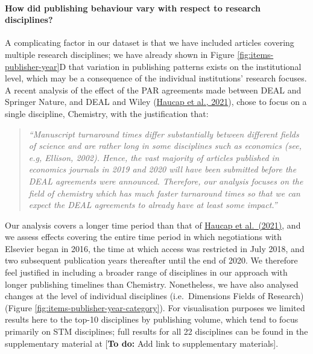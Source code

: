 \documentclass[
]{article}
\begin{document}
\hypertarget{how-did-publishing-behaviour-vary-with-respect-to-research-disciplines}{%
\paragraph{How did publishing behaviour vary with respect to research disciplines?}\label{how-did-publishing-behaviour-vary-with-respect-to-research-disciplines}}

A complicating factor in our dataset is that we have included articles covering multiple research disciplines; we have already shown in Figure \ref{fig:items-publisher-year}D that variation in publishing patterns exists on the institutional level, which may be a consequence of the individual institutions' research focuses. A recent analysis of the effect of the PAR agreements made between DEAL and Springer Nature, and DEAL and Wiley (\href{https://www.cesifo.org/en/publikationen/2021/working-paper/impact-german-deal-competition-academic-publishing-market}{Haucap et al., 2021}), chose to focus on a single discipline, Chemistry, with the justification that:

\begin{quote}
\emph{``Manuscript turnaround times differ substantially between different fields of science and are rather long in some disciplines such as economics (see, e.g, Ellison, 2002). Hence, the vast majority of articles published in economics journals in 2019 and 2020 will have been submitted before the DEAL agreements were announced. Therefore, our analysis focuses on the field of chemistry which has much faster turnaround times so that we can expect the DEAL agreements to already have at least some impact.''}
\end{quote}

Our analysis covers a longer time period than that of \href{https://www.cesifo.org/en/publikationen/2021/working-paper/impact-german-deal-competition-academic-publishing-market}{Haucap et al.~(2021)}, and we assess effects covering the entire time period in which negotiations with Elsevier began in 2016, the time at which access was restricted in July 2018, and two subsequent publication years thereafter until the end of 2020. We therefore feel justified in including a broader range of disciplines in our approach with longer publishing timelines than Chemistry. Nonetheless, we have also analysed changes at the level of individual disciplines (i.e.~Dimensions Fields of Research) (Figure \ref{fig:items-publisher-year-category}). For visualisation purposes we limited results here to the top-10 disciplines by publishing volume, which tend to focus primarily on STM disciplines; full results for all 22 disciplines can be found in the supplementary material at {[}\textbf{To do:} Add link to supplementary materials{]}.
\end{document}
